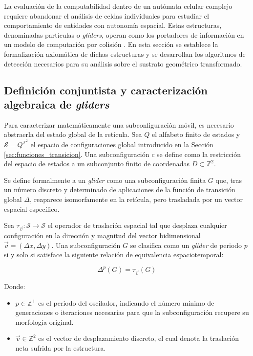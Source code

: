 La evaluación de la computabilidad dentro de un autómata celular complejo requiere abandonar el análisis de celdas individuales para estudiar el comportamiento de entidades con autonomía espacial. Estas estructuras, denominadas partículas o \textit{gliders}, operan como los portadores de información en un modelo de computación por colisión \cite{Basurto2009}. En esta sección se establece la formalización axiomática de dichas estructuras y se desarrollan los algoritmos de detección necesarios para su análisis sobre el sustrato geométrico transformado.

\subsection{Definición conjuntista y caracterización algebraica de \textit{gliders}}
\label{subsec:caracterizacion_gliders}

Para caracterizar matemáticamente una subconfiguración móvil, es necesario abstraerla del estado global de la retícula. Sea $Q$ el alfabeto finito de estados y $\mathcal{S} = Q^{\mathbb{Z}^2}$ el espacio de configuraciones global introducido en la Sección \ref{sec:funciones_transicion}. Una subconfiguración $c$ se define como la restricción del espacio de estados a un subconjunto finito de coordenadas $D \subset \mathbb{Z}^2$. 

Se define formalmente a un \textit{glider} como una subconfiguración finita $G$ que, tras un número discreto y determinado de aplicaciones de la función de transición global $\Delta$, reaparece isomorfamente en la retícula, pero trasladada por un vector espacial específico. 

Sea $\tau_{\vec{v}}: \mathcal{S} \to \mathcal{S}$ el operador de traslación espacial tal que desplaza cualquier configuración en la dirección y magnitud del vector bidimensional $\vec{v} = (\Delta x, \Delta y)$. Una subconfiguración $G$ se clasifica como un \textit{glider} de periodo $p$ si y solo si satisface la siguiente relación de equivalencia espaciotemporal:

\begin{equation}
\Delta^p(G) = \tau_{\vec{v}}(G)
\label{eq:invariancia_glider}
\end{equation}

Donde:
\begin{itemize}
    \item $p \in \mathbb{Z}^+$ es el periodo del oscilador, indicando el número mínimo de generaciones o iteraciones necesarias para que la subconfiguración recupere su morfología original.
    \item $\vec{v} \in \mathbb{Z}^2$ es el vector de desplazamiento discreto, el cual denota la traslación neta sufrida por la estructura.
\end{itemize}

